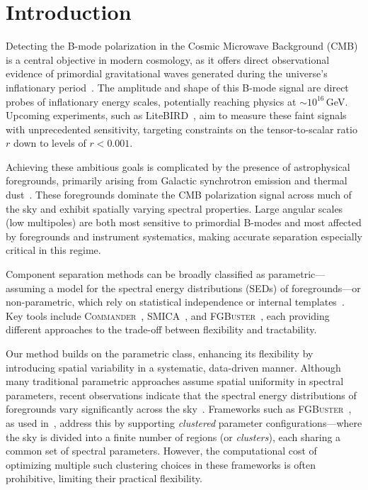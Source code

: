 \documentclass[%
 reprint,
bibnotes,
 amsmath,amssymb,
 aps,
floatfix, 
]{revtex4-2}
\begin{document}
\section{Introduction}

Detecting the B-mode polarization in the Cosmic Microwave Background (CMB) is a central objective in modern cosmology, as it offers direct observational evidence of primordial gravitational waves generated during the universe’s inflationary period~\citep{Kamionkowski1997, Seljak1997}. The amplitude and shape of this B-mode signal are direct probes of inflationary energy scales, potentially reaching physics at $\sim10^{16}$\,GeV. Upcoming experiments, such as LiteBIRD~\citep{LiteBIRD2022}, aim to measure these faint signals with unprecedented sensitivity, targeting constraints on the tensor-to-scalar ratio $r$ down to levels of $r < 0.001$.

Achieving these ambitious goals is complicated by the presence of astrophysical foregrounds, primarily arising from Galactic synchrotron emission and thermal dust~\citep{Planck2016SED, MeisnerFinkbeiner2015}. These foregrounds dominate the CMB polarization signal across much of the sky and exhibit spatially varying spectral properties. Large angular scales (low multipoles) are both most sensitive to primordial B-modes and most affected by foregrounds and instrument systematics, making accurate separation especially critical in this regime.

Component separation methods can be broadly classified as parametric---assuming a model for the spectral energy distributions (SEDs) of foregrounds---or non-parametric, which rely on statistical independence or internal templates~\citep{Delabrouille2003, Cardoso2008}. Key tools include \textsc{Commander}~\citep{Eriksen2008, Planck2016Commander}, \textsc{SMICA}~\citep{Cardoso2008, Planck2016SMICA}, and \textsc{FGBuster}~\citep{FGBUSTER1, FGBUSTER2}, each providing different approaches to the trade-off between flexibility and tractability.

Our method builds on the parametric class, enhancing its flexibility by introducing spatial variability in a systematic, data-driven manner. Although many traditional parametric approaches assume spatial uniformity in spectral parameters, recent observations indicate that the spectral energy distributions of foregrounds vary significantly across the sky~\citep{Planck2016SED, MeisnerFinkbeiner2015}. Frameworks such as \textsc{FGBuster}~\citep{FGBUSTER1, FGBUSTER2}, as used in~\citep{LiteBIRD_PTEP_2022}, address this by supporting \textit{clustered} parameter configurations—where the sky is divided into a finite number of regions (or \textit{clusters}), each sharing a common set of spectral parameters. However, the computational cost of optimizing multiple such clustering choices in these frameworks is often prohibitive, limiting their practical flexibility.
\end{document}
